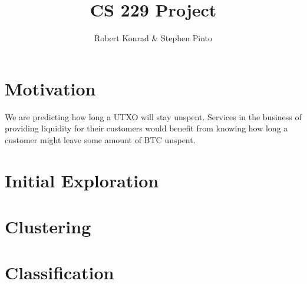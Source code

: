 \documentclass[12pt]{article}
\title{CS 229 Project}
\author{Robert Konrad \& Stephen Pinto}
\begin{document}
\maketitle

\section{Motivation} %
\label{sec:motivation}
We are predicting how long a UTXO will stay unspent. Services in the business of providing liquidity for their customers would benefit from knowing how long a customer might leave some amount of BTC unspent.

\section{Initial Exploration}


\section{Clustering}

\section{Classification}
\end{document}
